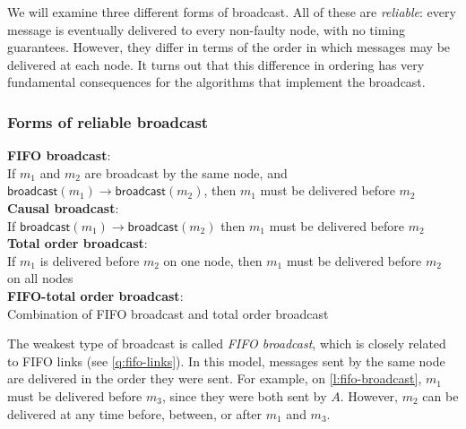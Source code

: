 We will examine three different forms of broadcast.
All of these are \emph{reliable}: every message is eventually delivered to every non-faulty node, with no timing guarantees.
However, they differ in terms of the order in which messages may be delivered at each node.
It turns out that this difference in ordering has very fundamental consequences for the algorithms that implement the broadcast.

\begin{frame}
    \label{s:broadcast-order}
    \frametitle{Forms of reliable broadcast}
    \textbf{FIFO broadcast}:\\
    If $m_1$ and $m_2$ are broadcast by the same node, and $\mathsf{broadcast}(m_1) \rightarrow \mathsf{broadcast}(m_2)$, then $m_1$ must be delivered before $m_2$\\[1em]\pause
    \textbf{Causal broadcast}:\\
    If $\mathsf{broadcast}(m_1) \rightarrow \mathsf{broadcast}(m_2)$ then $m_1$ must be delivered before $m_2$\\[1em]\pause
    \textbf{Total order broadcast}:\\
    If $m_1$ is delivered before $m_2$ on one node, then $m_1$ must be delivered before $m_2$ on all nodes\\[1em]\pause
    \textbf{FIFO-total order broadcast}:\\
    Combination of FIFO broadcast and total order broadcast
\end{frame}
\label{l:broadcast-order}


The weakest type of broadcast is called \emph{FIFO broadcast}, which is closely related to FIFO links (see \autoref{q:fifo-links}).
In this model, messages sent by the same node are delivered in the order they were sent.
For example, on \autoref{l:fifo-broadcast}, $m_1$ must be delivered before $m_3$, since they were both sent by $A$.
However, $m_2$ can be delivered at any time before, between, or after $m_1$ and $m_3$.

